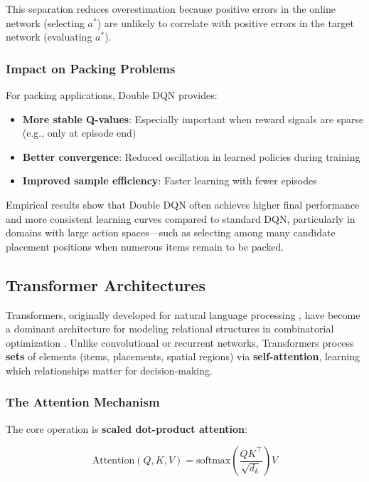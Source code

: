 This separation reduces overestimation because positive errors in the online network (selecting $a^*$) are unlikely to correlate with positive errors in the target network (evaluating $a^*$).

\subsubsection{Impact on Packing Problems}

For packing applications, Double DQN provides:

\begin{itemize}
\item \textbf{More stable Q-values}: Especially important when reward signals are sparse (e.g., only at episode end)
\item \textbf{Better convergence}: Reduced oscillation in learned policies during training
\item \textbf{Improved sample efficiency}: Faster learning with fewer episodes
\end{itemize}

Empirical results \cite{HGS16} show that Double DQN often achieves higher final performance and more consistent learning curves compared to standard DQN, particularly in domains with large action spaces---such as selecting among many candidate placement positions when numerous items remain to be packed.


\subsection{Transformer Architectures}

Transformers, originally developed for natural language processing \cite{VSP+17}, have become a dominant architecture for modeling relational structures in combinatorial optimization \cite{KW19, XGP+24}. Unlike convolutional or recurrent networks, Transformers process \textbf{sets} of elements (items, placements, spatial regions) via \textbf{self-attention}, learning which relationships matter for decision-making.

\subsubsection{The Attention Mechanism}

The core operation is \textbf{scaled dot-product attention}:

\begin{equation}
\text{Attention}(Q, K, V) = \text{softmax}\left(\frac{QK^\top}{\sqrt{d_k}}\right) V
\end{equation}

